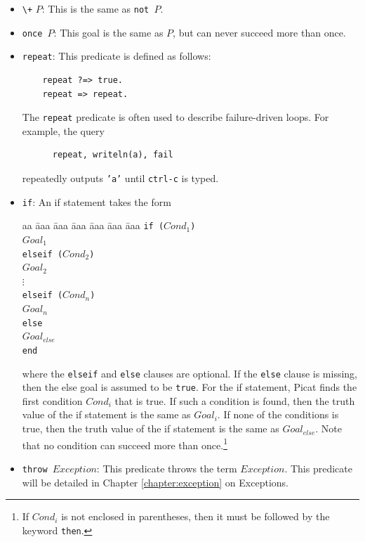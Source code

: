 \begin{itemize}
\item \verb-\+- \texttt{$P$}: This is the same as \texttt{not $P$}.
\item \texttt{once $P$}: This goal is the same as $P$, but can never succeed more than once.
\item \texttt{repeat}: This predicate is defined as follows:
\begin{verbatim}
    repeat ?=> true.
    repeat => repeat.
\end{verbatim}
The \texttt{repeat} predicate is often used to describe failure-driven loops. For example, the query 
\begin{verbatim}
      repeat, writeln(a), fail
\end{verbatim} 
repeatedly outputs \texttt{'a'} until \texttt{ctrl-c} is typed.
\item \texttt{if}: An if statement takes the form
\begin{tabbing}
aa \= aaa \= aaa \= aaa \= aaa \= aaa \= aaa \kill
\> \texttt{if ($Cond_1$)} \\
\> \> $Goal_1$ \\
\> \texttt{elseif ($Cond_2$)} \\
\> \> $Goal_2$ \\
\> \> $\vdots$ \\
\> \texttt{elseif ($Cond_{n}$)} \\
\> \> $Goal_{n}$ \\
\> \texttt{else} \\
\> \> $Goal_{else}$ \\
\> \texttt{end}
\end{tabbing}
where the \texttt{elseif} and \texttt{else} clauses are optional. If the \texttt{else} clause is missing, then the else goal is assumed to be \texttt{true}. For the if statement, Picat finds the first condition $Cond_i$ that is true. If such a condition is found, then the truth value of the if statement is the same as $Goal_i$. If none of the conditions is true, then the truth value of the if statement is the same as $Goal_{else}$. Note that no condition can succeed more than once.\footnote{If $Cond_i$ is not enclosed in parentheses, then it must be followed by the keyword \texttt{then}.}
\item \texttt{throw $Exception$}: This predicate throws the term $Exception$. This predicate will be detailed in Chapter \ref{chapter:exception} on Exceptions.


\end{itemize}
